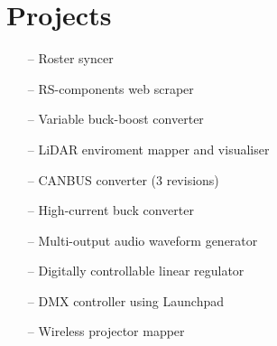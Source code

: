 \section{Projects}

\begin{itemize}[leftmargin=10pt, itemsep=0pt]
    \item[--] Roster syncer
    \item[--] RS-components web scraper
    \item[--] Variable buck-boost converter
    \item[--] LiDAR enviroment mapper and visualiser
    \item[--] CANBUS converter (3 revisions)
    \item[--] High-current buck converter
    \item[--] Multi-output audio waveform generator
    \item[--] Digitally controllable linear regulator
    \item[--] DMX controller using Launchpad
    \item[--] Wireless projector mapper
\end{itemize}
